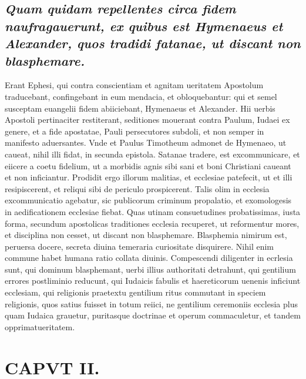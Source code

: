 \documentclass{article}
\begin{document}
\begin{pages}
\subsection*{\textit{Quam quidam repellentes circa fidem naufragauerunt, ex quibus est Hymenaeus et Alexander, quos tradidi fatanae, ut discant non blasphemare. }}\pstart Erant Ephesi, qui contra conscientiam et agnitam ueritatem Apostolum traducebant, confingebant in eum mendacia, et obloquebantur: qui et semel susceptam euangelii fidem abiiciebant, Hymenaeus et Alexander. Hii uerbis Apostoli pertinaciter restiterant, seditiones mouerant contra Paulum, Iudaei ex genere, et a fide apostatae, Pauli persecutores subdoli, et non semper in manifesto aduersantes. Vnde et Paulus Timotheum admonet de Hymenaeo, ut caueat, nihil illi fidat, in secunda epistola. Satanae tradere, est excommunicare, et eiicere a coetu fidelium, ut a morbidis agnis sibi sani et boni Christiani caueant et non inficiantur. Prodidit ergo illorum malitias, et ecclesiae patefecit, ut et illi resipiscerent, et reliqui sibi de periculo prospicerent. Talis olim in ecclesia excommunicatio agebatur, sic publicorum criminum propalatio, et exomologesis in aedificationem ecclesiae fiebat. Quas utinam consuetudines probatissimas, iusta forma, secundum apostolicas traditiones ecclesia recuperet, ut reformentur mores, et disciplina non cesset, ut discant non blasphemare. Blasphemia nimirum est, peruersa docere, secreta diuina temeraria curiositate disquirere. Nihil enim commune habet humana ratio collata diuinis. Compescendi diligenter in ecrlesia sunt, qui dominum blasphemant, uerbi illius authoritati detrahunt, qui gentilium errores postliminio reducunt, qui Iudaicis fabulis et haereticorum uenenis inficiunt ecclesiam, qui religionis praetextu gentilium ritus commutant in speciem religionis, quos satius fuisset in totum reiici, ne gentilium ceremoniis ecclesia plus quam Iudaica grauetur, puritasque doctrinae et operum commaculetur, et tandem opprimatueritatem.  \pend
\endnumbering\beginnumbering\section{CAPVT II.}
{}

\end{pages}
\end{document}
